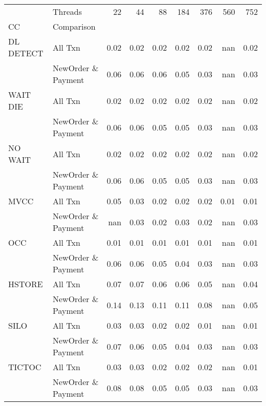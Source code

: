 \begin{tabular}{llrrrrrrr}
\toprule
       & Threads &  22  &  44  &  88  &  184 &  376 &  560 &  752 \\
CC & Comparison &      &      &      &      &      &      &      \\
\midrule
DL DETECT & All Txn & 0.02 & 0.02 & 0.02 & 0.02 & 0.02 &  nan & 0.02 \\
       & NewOrder \& Payment & 0.06 & 0.06 & 0.06 & 0.05 & 0.03 &  nan & 0.03 \\
WAIT DIE & All Txn & 0.02 & 0.02 & 0.02 & 0.02 & 0.02 &  nan & 0.02 \\
       & NewOrder \& Payment & 0.06 & 0.06 & 0.05 & 0.05 & 0.03 &  nan & 0.03 \\
NO WAIT & All Txn & 0.02 & 0.02 & 0.02 & 0.02 & 0.02 &  nan & 0.02 \\
       & NewOrder \& Payment & 0.06 & 0.06 & 0.05 & 0.05 & 0.03 &  nan & 0.03 \\
MVCC & All Txn & 0.05 & 0.03 & 0.02 & 0.02 & 0.02 & 0.01 & 0.01 \\
       & NewOrder \& Payment &  nan & 0.03 & 0.02 & 0.03 & 0.02 &  nan & 0.03 \\
OCC & All Txn & 0.01 & 0.01 & 0.01 & 0.01 & 0.01 &  nan & 0.01 \\
       & NewOrder \& Payment & 0.06 & 0.06 & 0.05 & 0.04 & 0.03 &  nan & 0.03 \\
HSTORE & All Txn & 0.07 & 0.07 & 0.06 & 0.06 & 0.05 &  nan & 0.04 \\
       & NewOrder \& Payment & 0.14 & 0.13 & 0.11 & 0.11 & 0.08 &  nan & 0.05 \\
SILO & All Txn & 0.03 & 0.03 & 0.02 & 0.02 & 0.01 &  nan & 0.01 \\
       & NewOrder \& Payment & 0.07 & 0.06 & 0.05 & 0.04 & 0.03 &  nan & 0.03 \\
TICTOC & All Txn & 0.03 & 0.03 & 0.02 & 0.02 & 0.02 &  nan & 0.01 \\
       & NewOrder \& Payment & 0.08 & 0.08 & 0.05 & 0.05 & 0.03 &  nan & 0.03 \\
\bottomrule
\end{tabular}
